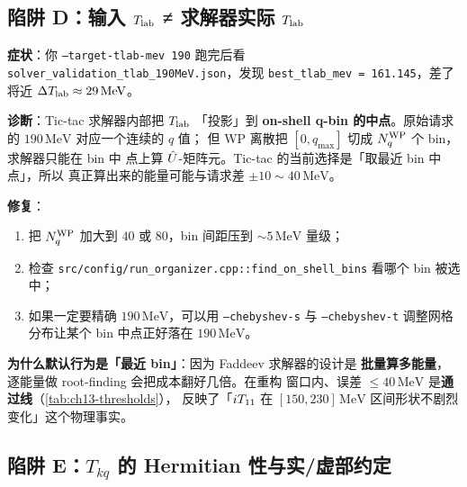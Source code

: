 \subsection{陷阱 D：输入 \({T_{\text{lab}}}\) ≠ 求解器实际 \({T_{\text{lab}}}\)}
\label{subsec:ch13-pitfall-input-vs-solver-tlab}

\begin{pitfallbox}
\textbf{症状}：你 \texttt{--target-tlab-mev 190} 跑完后看
\texttt{solver\_validation\_tlab\_190MeV.json}，发现
\texttt{best\_tlab\_mev = 161.145}，差了将近
\(\Delta{T_{\text{lab}}} \approx 29\,\text{MeV}\)。

\textbf{诊断}：Tic-tac 求解器内部把 \({T_{\text{lab}}}\) 「投影」到\textbf{ on-shell
q-bin 的中点}。原始请求的 \(190\,\text{MeV}\) 对应一个连续的 \(q\) 值；
但 WP 离散把 \([0, q_{\max}]\) 切成 \({N_{q}^{\text{WP}}}\) 个 bin，求解器只能在 bin 中
点上算 \(\hat{U}\)-矩阵元。Tic-tac 的当前选择是「取最近 bin 中点」，所以
真正算出来的能量可能与请求差 \(\pm 10\sim 40\,\text{MeV}\)。

\textbf{修复}：
\begin{enumerate}
  \item 把 \({N_{q}^{\text{WP}}}\) 加大到 \(40\) 或 \(80\)，bin 间距压到
        \(\sim 5\,\text{MeV}\) 量级；
  \item 检查 \texttt{src/config/run\_organizer.cpp::find\_on\_shell\_bins}
        看哪个 bin 被选中；
  \item 如果一定要精确 \(190\,\text{MeV}\)，可以用 \texttt{--chebyshev-s}
        与 \texttt{--chebyshev-t} 调整网格分布让某个 bin 中点正好落在
        \(190\,\text{MeV}\)。
\end{enumerate}

\textbf{为什么默认行为是「最近 bin」}：因为 Faddeev 求解器的设计是
\textbf{批量算多能量}，逐能量做 root-finding 会把成本翻好几倍。在重构
窗口内、误差 \(\le 40\,\text{MeV}\) 是\textbf{通过线}（\cref{tab:ch13-thresholds}），
反映了「\({i T_{11}}\) 在
\([150, 230]\,\text{MeV}\) 区间形状不剧烈变化」这个物理事实。
\end{pitfallbox}

\subsection{陷阱 E：\(T_{kq}\) 的 Hermitian 性与实/虚部约定}
\label{subsec:ch13-pitfall-hermiticity}

